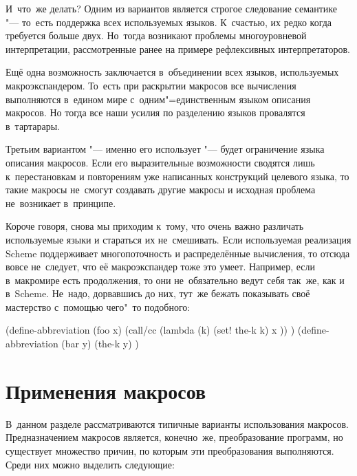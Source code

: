 И~что~же делать? Одним из вариантов является строгое следование семантике "---
то~есть поддержка всех используемых языков. К~счастью, их редко когда требуется
больше двух. Но~тогда возникают проблемы многоуровневой интерпретации,
рассмотренные ранее на примере рефлексивных интерпретаторов.

Ещё одна возможность заключается в~объединении всех языков, используемых
макроэкспандером. То~есть при раскрытии макросов все вычисления выполняются
в~едином мире с~одним"=единственным языком описания макросов. Но тогда все наши
усилия по разделению языков провалятся в~тартарары.

Третьим вариантом "--- именно его использует {\RnRS} "--- будет ограничение
языка описания макросов. Если его выразительные возможности сводятся лишь
к~перестановкам и повторениям уже написанных конструкций целевого языка, то
такие макросы не~смогут создавать другие макросы и исходная проблема
не~возникает в~принципе.

Короче говоря, снова мы приходим к~тому, что очень важно различать используемые
языки и стараться их не~смешивать. Если используемая реализация Scheme
поддерживает многопоточность и распределённые вычисления, то отсюда вовсе
не~следует, что её макроэкспандер тоже это умеет. Например, если в~макромире
есть продолжения, то они не~обязательно ведут себя так~же, как и в~Scheme.
Не~надо, дорвавшись до них, тут~же бежать показывать своё мастерство с~помощью
чего"~то подобного:

\begin{code:lisp}
(define-abbreviation (foo x)
  (call/cc (lambda (k)
             (set! the-k k)
             x )) )
(define-abbreviation (bar y)
  (the-k y) )
\end{code:lisp}


\section{Применения макросов}\label{macros/sect:usage}

В~данном разделе рассматриваются типичные варианты использования макросов.
Предназначением макросов является, конечно~же, преобразование программ, но
существует множество причин, по которым эти преобразования выполняются. Среди
них можно выделить следующие:

